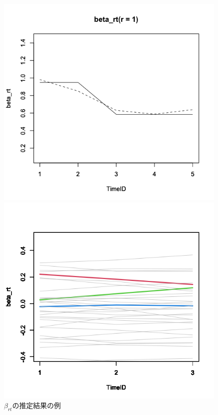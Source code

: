 \documentclass[dvipdfmx, twocolumn, a4paper]{hcresume}
\begin{document}
\begin{figure}[t]
   \begin{minipage}[b]{4cm}
    \includegraphics[keepaspectratio, scale=0.22]{img/beta_rt_param.png}
   \end{minipage}
   \begin{minipage}[b]{4cm}
    \includegraphics[keepaspectratio, scale=0.22]{img/beta_rt_data.png}
   \end{minipage}
  \caption{$\beta_{rt}$の推定結果の例}
  \label{beta_rt_data}
  \vspace*{0.5cm}
\end{figure}
\end{document}

